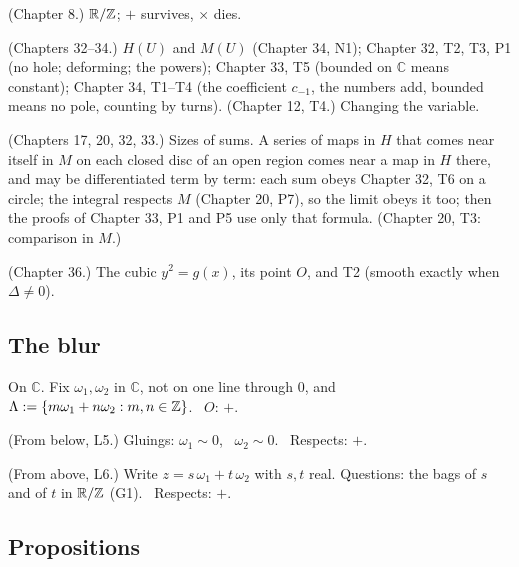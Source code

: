 \begin{lines}
\item[\lab{G1}] (Chapter 8.) $\mathbb{R}/\mathbb{Z}$; $+$ survives, $\times$ dies.
\item[\lab{G2}] (Chapters 32--34.) $H(U)$ and $M(U)$ (Chapter 34, N1); Chapter 32, T2, T3, P1 (no hole; deforming; the powers); Chapter 33, T5 (bounded on $\mathbb{C}$ means constant); Chapter 34, T1--T4 (the coefficient $c_{-1}$, the numbers add, bounded means no pole, counting by turns). (Chapter 12, T4.) Changing the variable.
\item[\lab{G3}] (Chapters 17, 20, 32, 33.) Sizes of sums. A series of maps in $H$ that comes near itself in $M$ on each closed disc of an open region comes near a map in $H$ there, and may be differentiated term by term: each sum obeys Chapter 32, T6 on a circle; the integral respects $M$ (Chapter 20, P7), so the limit obeys it too; then the proofs of Chapter 33, P1 and P5 use only that formula. (Chapter 20, T3: comparison in $M$.)
\item[\lab{G4}] (Chapter 36.) The cubic $y^2 = g(x)$, its point $O$, and T2 (smooth exactly when $\Delta \ne 0$).
\end{lines}

\subsection*{The blur}

On $\mathbb{C}$. Fix $\omega_1, \omega_2$ in $\mathbb{C}$, not on one line through $0$, and $\Lambda := \{m \omega_1 + n \omega_2 : m, n \in \mathbb{Z}\}$. \ $O$: $+$.

\begin{lines}
\item[\lab{B1}] (From below, L5.) Gluings: $\omega_1 \sim 0$, \ $\omega_2 \sim 0$. \ Respects: $+$.
\item[\lab{B2}] (From above, L6.) Write $z = s\,\omega_1 + t\,\omega_2$ with $s, t$ real. Questions: the bags of $s$ and of $t$ in $\mathbb{R}/\mathbb{Z}$ (G1). \ Respects: $+$.
\end{lines}

\subsection*{Propositions}

